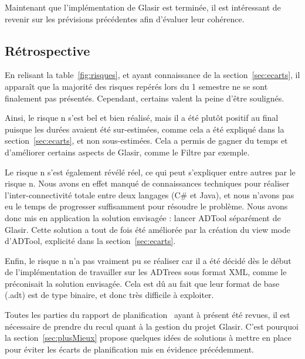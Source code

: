 Maintenant que l'implémentation de Glasir est terminée, il est intéressant de revenir sur les prévisions précédentes afin d'évaluer leur cohérence. 

\subsection{Rétrospective}
\label{ssec:risquesRetro}

En relisant la {\sc table}~\ref{fig:risques}, et ayant connaissance de la {\sc section}~\ref{sec:ecarts}, il apparaît que la majorité des risques repérés lors du 1\ier{} semestre ne se sont finalement pas présentés. Cependant, certains valent la peine d'être soulignés.

Ainsi, le risque n s'est bel et bien réalisé, mais il a été plutôt positif au final puisque les durées avaient été sur-estimées, comme cela a été expliqué dans la {\sc section}~\ref{sec:ecarts}, et non sous-estimées. Cela a permis de gagner du temps et d'améliorer certains aspects de Glasir, comme le Filtre par exemple.

Le risque n s'est également révélé réel, ce qui peut s'expliquer entre autres par le risque n. Nous avons en effet manqué de connaissances techniques pour réaliser l'inter-connectivité totale entre deux langages (C\# et Java), et nous n'avons pas eu le temps de progresser suffisamment pour résoudre le problème. Nous avons donc mis en application la solution envisagée : lancer ADTool séparément de Glasir. Cette solution a tout de fois été améliorée par la création du \og view mode \fg{} d'ADTool, explicité dans la {\sc section}~\ref{sec:ecarts}.

Enfin, le risque n n'a pas vraiment pu se réaliser car il a été décidé dès le début de l'implémentation de travailler sur les ADTrees sous format XML, comme le préconisait la solution envisagée. Cela est dû au fait que leur format de base (.adt) est de type binaire, et donc très difficile à exploiter.

Toutes les parties du rapport de planification~\cite{planif} ayant à présent été revues, il est nécessaire de prendre du recul quant à la gestion du projet Glasir. C'est pourquoi la {\sc section}~\ref{sec:plusMieux} propose quelques idées de solutions à mettre en place pour éviter les écarts de planification mis en évidence précédemment.